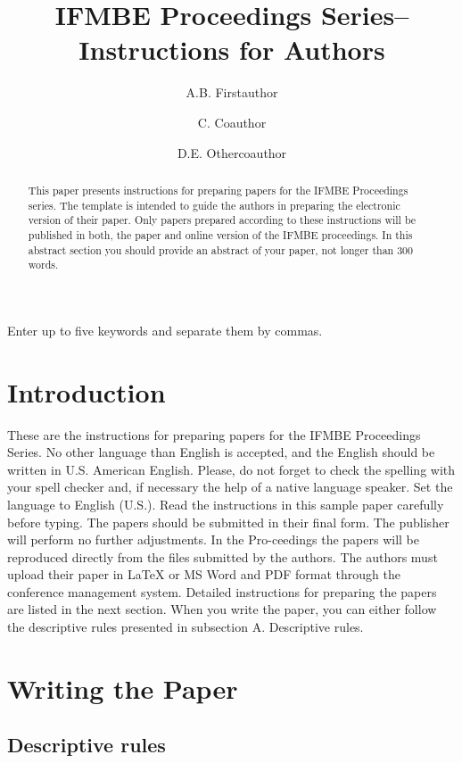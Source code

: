 \documentclass[nouppercase]{ifmbe}
\title{IFMBE Proceedings Series-- Instructions for Authors}
\affiliation{Institution/Department, Affiliation, City, Country }{FIRSTAFF}
\affiliation{Institution/Department, Affiliation, City, Country }{SECONDAFF}
\author{A.B. Firstauthor}{FIRSTAFF}
\author{C. Coauthor}{SECONDAFF}
\author{D.E. Othercoauthor}{FIRSTAFF}
\begin{document}
\maketitle

\begin{abstract}
This paper presents instructions for preparing papers for the IFMBE 
Proceedings series. The template is intended to guide the authors in 
preparing the electronic version of their paper. Only papers prepared 
according to these instructions will be published in both, the paper 
and online version of the IFMBE proceedings. In this abstract section 
you should provide an abstract of your paper, not longer than 300 words.

\end{abstract}

\begin{keywords}
Enter up to five keywords and separate them by commas.
\end{keywords}

\section{Introduction}

These are the instructions for preparing papers for the IFMBE Proceedings
Series. No other language than English is accepted, and the English should be written 
in U.S. American English. Please, do not forget to check the spelling with 
your spell checker and, if necessary the help of a native language speaker. 
Set the language to English (U.S.). Read the instructions in this sample 
paper carefully before typing.
The papers should be submitted in their final form. The publisher will 
perform no further adjustments. In the Pro-ceedings the papers will be 
reproduced directly from the files submitted by the authors. The authors 
must upload their paper in LaTeX or MS Word and PDF format through the 
conference management system.
Detailed instructions for preparing the papers are listed in the next 
section. When you write the paper, you can either follow the descriptive
rules presented in subsection A. Descriptive rules.

\section{Writing the Paper}

\subsection{Descriptive rules}
\end{document}
